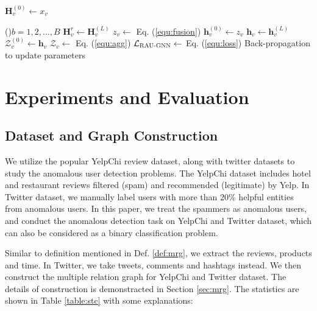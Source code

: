 \documentclass[conference]{IEEEtran}
\theoremstyle{definition}
\newcommand{\model}{\textsc{RAU-GNN}}
\begin{document}
\begin{algorithm}[h]
\SetAlgoVlined
{}
$\mathbf{H}^{(0)}_v \gets x_v$\;

\For(){$b = 1, 2, ..., B$}{
    $\mathbf{H}_v^{r} \gets \mathbf{H}_v^{(L)}$\;
$z_v \gets$ Eq. (\ref{equ:fusion})\;
$\mathbf{h}_v^{(0)} \gets z_v$\;
$\mathbf{h}_v \gets \mathbf{h}_v^{(L)}$\;
$\mathcal{Z}^{(0)}_v \gets \mathbf{h}_v$\;
$\mathcal{Z}_v \gets$ Eq. (\ref{equ:agg})\;
$\mathcal{L}_{\operatorname{\model}} \gets$ Eq. (\ref{equ:loss})\;
Back-propagation to update parameters\;
}


\caption{\model: GNN-based Relevance-Aware Anomalous Users Detection}
\end{algorithm}

\section{Experiments and Evaluation}\label{sec:experiment}
\subsection{Dataset and Graph Construction}
We utilize the popular YelpChi review dataset, along with twitter datasets to study the anomalous user detection problems.  
The YelpChi dataset includes hotel and restaurant reviews filtered (spam) and recommended (legitimate) by Yelp. 
In Twitter dataset, we manually label users with more than 20\% helpful entities from anomalous users.
In this paper, we treat the spammers as anomalous users, and conduct the anomalous detection task on YelpChi and Twitter dataset, which can also be considered as a binary classification problem.

Similar to definition mentioned in Def. \ref{def:mrg}, we extract the reviews, products and time. 
In Twitter, we take tweets, comments and hashtags instead. We then construct the multiple relation graph for YelpChi and Twitter dataset. The details of construction is demonstracted in Section \ref{sec:mrg}. The statistics are shown in Table \ref{table:stc} with some explanations:
\end{document}
